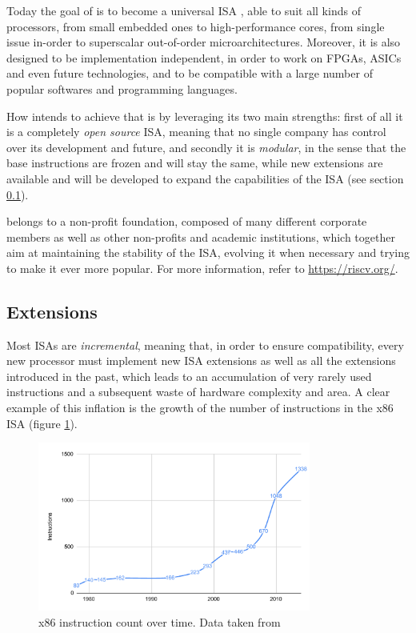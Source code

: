 Today the goal of \riscv is to become a universal \ac{ISA} \cite{reader}, able to suit all kinds of processors, from small embedded ones to high-performance cores, from single issue in-order to superscalar out-of-order microarchitectures. Moreover, it is also designed to be implementation independent, in order to work on FPGAs, ASICs and even future technologies, and to be compatible with a large number of popular softwares and programming languages.

How \riscv intends to achieve that is by leveraging its two main strengths: first of all it is a completely \emph{open source} \ac{ISA}, meaning that no single company has control over its development and future, and secondly it is \emph{modular}, in the sense that the base instructions are frozen and will stay the same, while new extensions are available and will be developed to expand the capabilities of the ISA (see section \ref{sec:extensions}).

\riscv belongs to a non-profit foundation, composed of many different corporate members as well as other non-profits and academic institutions, which together aim at maintaining the stability of the \ac{ISA}, evolving it when necessary and trying to make it ever more popular. For more information, refer to \url{https://riscv.org/}.

\subsection{Extensions}\label{sec:extensions}
Most \acp{ISA} are \emph{incremental}, meaning that, in order to ensure compatibility, every new processor must implement new \ac{ISA} extensions as well as all the extensions introduced in the past, which leads to an accumulation of very rarely used instructions and a subsequent waste of hardware complexity and area. A clear example of this inflation is the growth of the number of instructions in the x86 \ac{ISA} (figure \ref{fig:x86}).

\begin{figure}[hbtp]
  \centering
  \includegraphics[width=0.8\textwidth]{img/x86.pdf}
  \caption[x86 instruction count over time]{x86 instruction count over time. Data taken from \cite[p.~3]{reader}}
  \label{fig:x86}
\end{figure}

